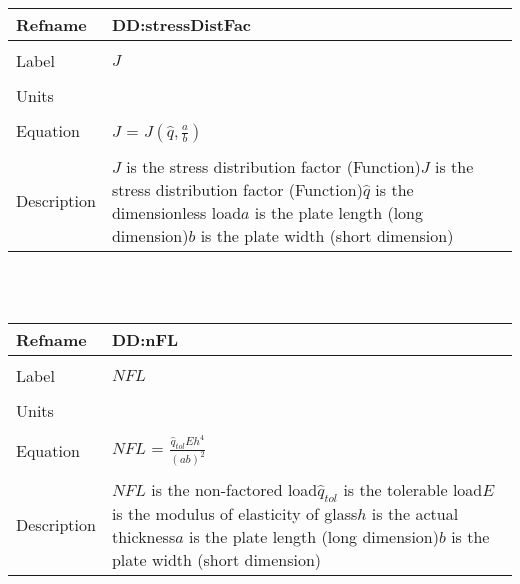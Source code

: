 \documentclass[12pt]{article}
\begin{document}
~\newline
\noindent \begin{minipage}{\textwidth}
\begin{tabular}{p{} p{}}
\toprule \textbf{Refname} & \textbf{DD:stressDistFac}
\label{DD:stressDistFac}
\\ \midrule \\
Label & $J$
\\ \midrule \\
Units & 
\\ \midrule \\
Equation & $J$ = $J\left(\hat{q},\frac{a}{b}\right)$
\\ \midrule \\
Description & $J$ is the stress distribution factor (Function)\newline$J$ is the stress distribution factor (Function)\newline$\hat{q}$ is the dimensionless load\newline$a$ is the plate length (long dimension)\newline$b$ is the plate width (short dimension)
\\ \bottomrule \end{tabular}
\end{minipage}\\
~\newline
\noindent \begin{minipage}{\textwidth}
\begin{tabular}{p{} p{}}
\toprule \textbf{Refname} & \textbf{DD:nFL}
\label{DD:nFL}
\\ \midrule \\
Label & $NFL$
\\ \midrule \\
Units & 
\\ \midrule \\
Equation & $NFL$ = $\frac{\hat{q}_{tol}Eh^{4}}{\left(ab\right)^{2}}$
\\ \midrule \\
Description & $NFL$ is the non-factored load\newline$\hat{q}_{tol}$ is the tolerable load\newline$E$ is the modulus of elasticity of glass\newline$h$ is the actual thickness\newline$a$ is the plate length (long dimension)\newline$b$ is the plate width (short dimension)
\\ \bottomrule \end{tabular}
\end{minipage}\\
\end{document}
